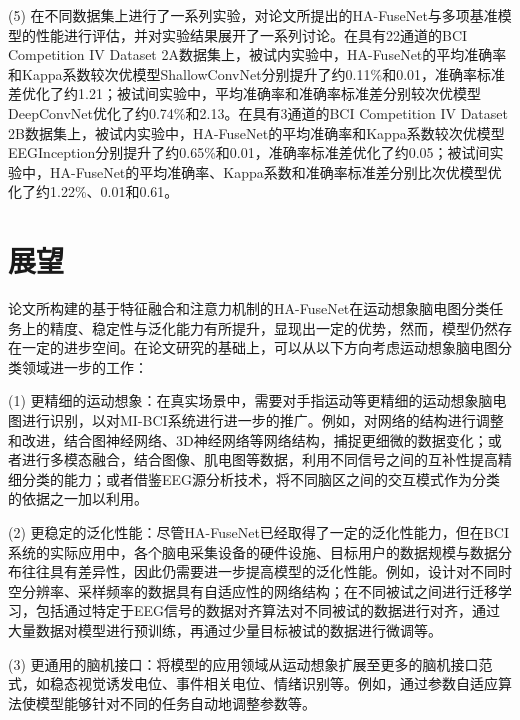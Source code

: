 (5) 在不同数据集上进行了一系列实验，对论文所提出的HA-FuseNet与多项基准模型的性能进行评估，并对实验结果展开了一系列讨论。在具有22通道的BCI Competition IV Dataset 2A数据集上，被试内实验中，HA-FuseNet的平均准确率和Kappa系数较次优模型ShallowConvNet分别提升了约0.11\%和0.01，准确率标准差优化了约1.21；被试间实验中，平均准确率和准确率标准差分别较次优模型DeepConvNet优化了约0.74\%和2.13。在具有3通道的BCI Competition IV Dataset 2B数据集上，被试内实验中，HA-FuseNet的平均准确率和Kappa系数较次优模型EEGInception分别提升了约0.65\%和0.01，准确率标准差优化了约0.05；被试间实验中，HA-FuseNet的平均准确率、Kappa系数和准确率标准差分别比次优模型优化了约1.22\%、0.01和0.61。

\section{展望}

论文所构建的基于特征融合和注意力机制的HA-FuseNet在运动想象脑电图分类任务上的精度、稳定性与泛化能力有所提升，显现出一定的优势，然而，模型仍然存在一定的进步空间。在论文研究的基础上，可以从以下方向考虑运动想象脑电图分类领域进一步的工作：

(1) 更精细的运动想象：在真实场景中，需要对手指运动等更精细的运动想象脑电图进行识别，以对MI-BCI系统进行进一步的推广。例如，对网络的结构进行调整和改进，结合图神经网络、3D神经网络等网络结构，捕捉更细微的数据变化；或者进行多模态融合，结合图像、肌电图等数据，利用不同信号之间的互补性提高精细分类的能力；或者借鉴EEG源分析技术，将不同脑区之间的交互模式作为分类的依据之一加以利用。

(2) 更稳定的泛化性能：尽管HA-FuseNet已经取得了一定的泛化性能力，但在BCI系统的实际应用中，各个脑电采集设备的硬件设施、目标用户的数据规模与数据分布往往具有差异性，因此仍需要进一步提高模型的泛化性能。例如，设计对不同时空分辨率、采样频率的数据具有自适应性的网络结构；在不同被试之间进行迁移学习，包括通过特定于EEG信号的数据对齐算法对不同被试的数据进行对齐，通过大量数据对模型进行预训练，再通过少量目标被试的数据进行微调等。

(3) 更通用的脑机接口：将模型的应用领域从运动想象扩展至更多的脑机接口范式，如稳态视觉诱发电位、事件相关电位、情绪识别等。例如，通过参数自适应算法使模型能够针对不同的任务自动地调整参数等。